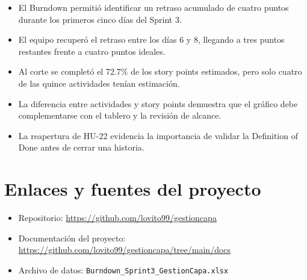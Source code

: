 \documentclass[12pt,a4paper]{article}
\begin{document}
\begin{itemize}
    \item El Burndown permitió identificar un retraso acumulado de cuatro
    puntos durante los primeros cinco días del Sprint 3.
    \item El equipo recuperó el retraso entre los días 6 y 8, llegando a tres
    puntos restantes frente a cuatro puntos ideales.
    \item Al corte se completó el 72.7\% de los story points estimados, pero
    solo cuatro de las quince actividades tenían estimación.
    \item La diferencia entre actividades y story points demuestra que el
    gráfico debe complementarse con el tablero y la revisión de alcance.
    \item La reapertura de HU-22 evidencia la importancia de validar la
    Definition of Done antes de cerrar una historia.
\end{itemize}

\section{Enlaces y fuentes del proyecto}

\begin{itemize}
    \item Repositorio: \url{https://github.com/lovito99/gestioncapa}
    \item Documentación del proyecto: \url{https://github.com/lovito99/gestioncapa/tree/main/docs}
    \item Archivo de datos: \texttt{Burndown\_Sprint3\_GestionCapa.xlsx}
\end{itemize}
\end{document}
